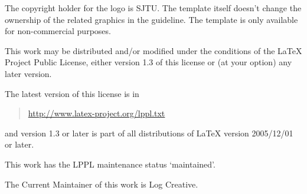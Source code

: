 \documentclass[a4paper,12pt]{article}
\begin{document}
\begin{CJK}{UTF8}{song}
The copyright holder for the logo is SJTU. The template itself doesn't change the ownership of the related graphics in the guideline. The template is only available for non-commercial purposes.

This work may be distributed and/or modified under the
conditions of the \LaTeX{} Project Public License, either version 1.3 of this license or (at your option) any later version.

The latest version of this license is in
\begin{quotation}
    \href{http://www.latex-project.org/lppl.txt}{http://www.latex-project.org/lppl.txt}
\end{quotation}
and version 1.3 or later is part of all distributions of \LaTeX{}
version 2005/12/01 or later.

This work has the LPPL maintenance status `maintained'.

The Current Maintainer of this work is Log Creative.

%

\end{CJK}
\end{document}

